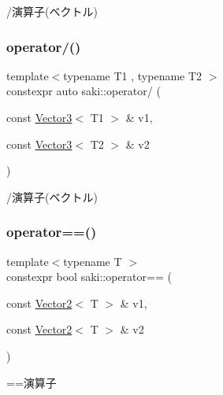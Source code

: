 /演算子(ベクトル) 

\mbox{\label{namespacesaki_a7af3750f8a88499eca7784ad18753111}} 
\subsubsection{\texorpdfstring{operator/()}{operator/()}\hspace{0.1cm}{\footnotesize\ttfamily [4/4]}}
{\footnotesize\ttfamily template$<$typename T1 , typename T2 $>$ \\
constexpr auto saki\+::operator/ (\begin{DoxyParamCaption}\item[{const \mbox{\hyperlink{classsaki_1_1_vector3}{Vector3}}$<$ T1 $>$ \&}]{v1,  }\item[{const \mbox{\hyperlink{classsaki_1_1_vector3}{Vector3}}$<$ T2 $>$ \&}]{v2 }\end{DoxyParamCaption})}



/演算子(ベクトル) 

\mbox{\label{namespacesaki_aebe3f4c69f62ec8edc68723c5194c3b9}} 
\subsubsection{\texorpdfstring{operator==()}{operator==()}\hspace{0.1cm}{\footnotesize\ttfamily [1/4]}}
{\footnotesize\ttfamily template$<$typename T $>$ \\
constexpr bool saki\+::operator== (\begin{DoxyParamCaption}\item[{const \mbox{\hyperlink{classsaki_1_1_vector2}{Vector2}}$<$ T $>$ \&}]{v1,  }\item[{const \mbox{\hyperlink{classsaki_1_1_vector2}{Vector2}}$<$ T $>$ \&}]{v2 }\end{DoxyParamCaption})}



==演算子 

\mbox{\label{namespacesaki_a29747cf04c5a821834f7a1fea39e4050}} 
